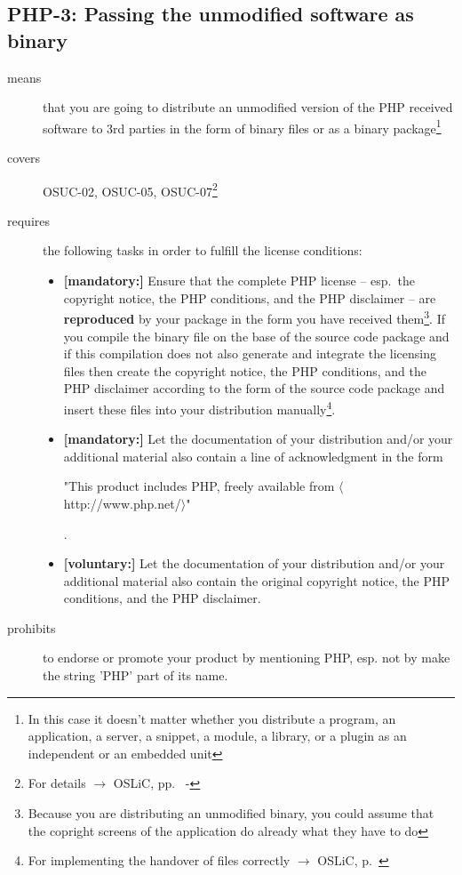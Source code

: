 \subsection{PHP-3: Passing the unmodified software as binary}

\begin{description}

\item[means] that you are going to distribute an unmodified version of the PHP
received software to 3rd parties in the form of binary files or as a bi\-na\-ry
package\footnote{In this case it doesn't matter whether you distribute a
program, an application, a server, a snippet, a module, a library, or a plugin
as an independent or an embedded unit}

\item[covers] OSUC-02, OSUC-05, OSUC-07\footnote{For details $\rightarrow$ OSLiC, pp.\
\pageref{OSUC-02-DEF} - \pageref{OSUC-07-DEF}}

\item[requires] the following tasks in order to fulfill the license conditions:
\begin{itemize}

  \item \textbf{[mandatory:]} Ensure that the complete PHP license -- esp.\ the
  copyright notice, the PHP conditions, and the PHP disclaimer -- are
  \textbf{reproduced} by your package in the form you have received
  them\footnote{Because you are distributing an unmodified binary, you could
  assume that the copright screens of the application do already what they have
  to do}. If you compile the binary file on the base of the source code package
  and if this compilation does not also generate and integrate the licensing
  files then create the copyright notice, the PHP conditions, and the PHP
  disclaimer according to the form of the source code package and insert these
  files into your distribution manually\footnote{For implementing the handover
  of files correctly $\rightarrow$ OSLiC, p.\ \pageref{DistributingFilesHint}}.
  
  \item \textbf{[mandatory:]} Let the documentation of your distribution and/or
  your additional material also contain a line of acknowledgment in the form
   \begin{footnotesize}"This product includes PHP, freely available from
  $\langle$http://www.php.net/$\rangle$"\end{footnotesize}.
    
  \item \textbf{[voluntary:]} Let the documentation of your distribution and/or
  your additional material also contain the original copyright notice, the PHP
  conditions, and the PHP disclaimer.

\end{itemize}

\item[prohibits] to endorse or promote your product by mentioning PHP, esp. not
by make the string 'PHP' part of its name.

\end{description}

